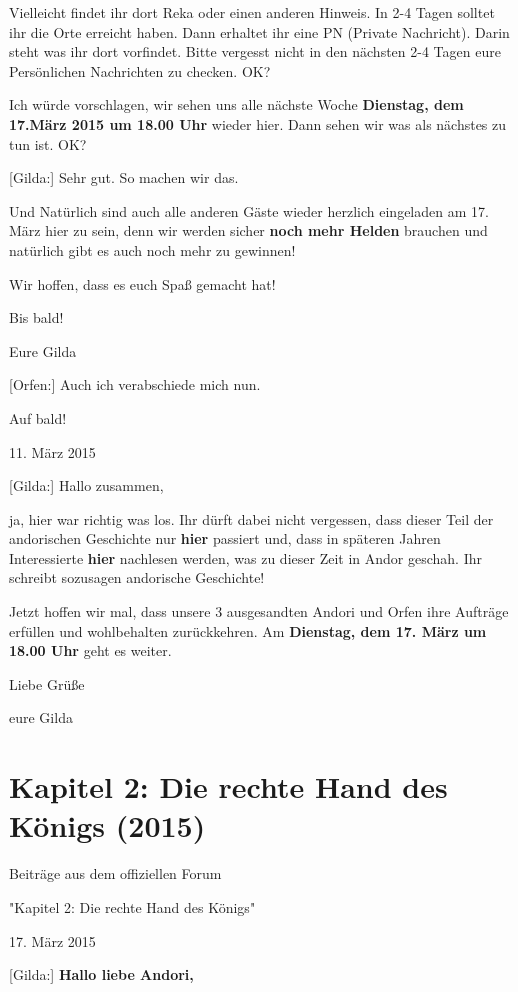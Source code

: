 \documentclass[10pt, a4paper, oneside]{book}
\newcommand{\fillbreak}{\vspace*{\fill}\columnbreak}
\newcommand{\storytext}[1]{%
    \section{#1}%
    \label{Storytext: #1}%
}
\begin{document}
\begin{multicols}{2}
Vielleicht findet ihr dort Reka oder einen anderen Hinweis. In 2-4 Tagen solltet ihr die Orte erreicht haben. Dann erhaltet ihr eine PN (Private Nachricht). Darin steht was ihr dort vorfindet. Bitte vergesst nicht in den nächsten 2-4 Tagen eure Persönlichen Nachrichten zu checken. OK?

Ich würde vorschlagen, wir sehen uns alle nächste Woche \textbf{Dienstag, dem 17.März 2015 um 18.00 Uhr} wieder hier. Dann sehen wir was als nächstes zu tun ist. OK?

[Gilda:] Sehr gut. So machen wir das.

Und Natürlich sind auch alle anderen Gäste wieder herzlich eingeladen am 17. März hier zu sein, denn wir werden sicher \textbf{noch mehr Helden} brauchen und natürlich gibt es auch noch mehr zu gewinnen!

Wir hoffen, dass es euch Spaß gemacht hat!

Bis bald!

Eure Gilda

[Orfen:] Auch ich verabschiede mich nun.

Auf bald!

\begin{center}
    11. März 2015
\end{center}



[Gilda:] Hallo zusammen,

ja, hier war richtig was los. Ihr dürft dabei nicht vergessen, dass dieser Teil der andorischen Geschichte nur \textbf{hier} passiert und, dass in späteren Jahren Interessierte \textbf{hier} nachlesen werden, was zu dieser Zeit in Andor geschah. Ihr schreibt sozusagen andorische Geschichte!

Jetzt hoffen wir mal, dass unsere 3 ausgesandten Andori und Orfen ihre Aufträge erfüllen und wohlbehalten zurückkehren. Am \textbf{Dienstag, dem 17. März um 18.00 Uhr} geht es weiter.

Liebe Grüße

eure Gilda


\fillbreak
\storytext{Kapitel 2: Die rechte Hand des Königs (2015)}


\begin{center}
    Beiträge aus dem offiziellen Forum

    "Kapitel 2: Die rechte Hand des Königs"

    17. März 2015
\end{center}

[Gilda:] \textbf{Hallo liebe Andori,}


\end{multicols}
\end{document}
